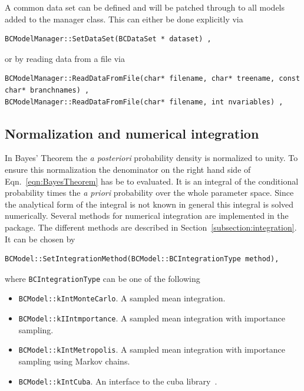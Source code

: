 \documentclass[11pt, a4paper]{article}
\begin{document}
\noindent 
A common data set can be defined and will be patched through to all
models added to the manager class. This can either be done explicitly
via
%
\begin{verbatim}
BCModelManager::SetDataSet(BCDataSet * dataset) , 
\end{verbatim} 

\noindent 
or by reading data from a file via 
%
\begin{small}
\begin{verbatim}
BCModelManager::ReadDataFromFile(char* filename, char* treename, const char* branchnames) , 
BCModelManager::ReadDataFromFile(char* filename, int nvariables) , 
\end{verbatim} 
\end{small} 


\subsection{Normalization and numerical integration} 
\label{section:normalization} 

In Bayes' Theorem the {\it a posteriori} probability density is
normalized to unity. To ensure this normalization the denominator on
the right hand side of Eqn.~\ref{eqn:BayesTheorem} has be to
evaluated. It is an integral of the conditional probability times the
{\it a priori} probability over the whole parameter space. Since the
analytical form of the integral is not known in general this integral
is solved numerically. Several methods for numerical integration are
implemented in the package. The different methods are described in
Section~\ref{subsection:integration}. It can be chosen by
%
\begin{verbatim}
BCModel::SetIntegrationMethod(BCModel::BCIntegrationType method), 
\end{verbatim} 

\noindent
where \verb|BCIntegrationType| can be one of the following 
% 
\begin{itemize}
\item \verb|BCModel::kIntMonteCarlo|. A sampled mean integration.
\item \verb|BCModel::kIIntmportance|. A sampled mean integration
 with importance sampling.  
\item \verb|BCModel::kIntMetropolis|. A sampled mean integration
 with importance sampling using Markov chains. 
\item \verb|BCModel::kIntCuba|. An interface to the cuba
library~\cite{Hahn:2004fe}.
\end{itemize}
\end{document}
